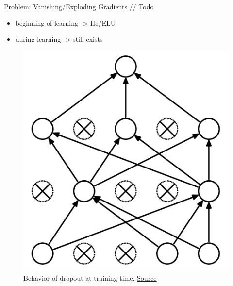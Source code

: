 \begin{frame}{Problem: Vanishing/Exploding Gradients}
	// Todo
    \begin{itemize}
    	\item beginning of learning -> He/ELU
    	\item during learning -> still exists
    \end{itemize}
    
    \begin{figure}[H]
    	\centering
    	\includegraphics[height=0.4\textheight]{Figs/Dropout-after.png}
    	\caption{Behavior of dropout at training time. \href{https://www.cs.toronto.edu/~hinton/absps/JMLRdropout.pdf}{Source}}
    \end{figure}
\end{frame}

